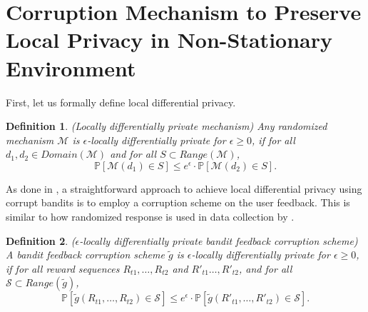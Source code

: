 \documentclass[letterpaper]{article} %
\newcommand{\bP}{\mathds{P}}
\newtheorem{myDefinition}{Definition}
\begin{document}
\section{Corruption Mechanism to Preserve Local Privacy in Non-Stationary Environment}
\label{sec:privacy}
First, let us formally define local differential privacy.
\begin{myDefinition}
\label{def:diff_privacy}
(Locally differentially private mechanism) Any randomized mechanism $\mathcal{M}$ is $\epsilon$-locally differentially private for $\epsilon \geq 0$, if for all  $d_1, d_2 \in Domain(\mathcal{M})$ and for all $S \subset Range(\mathcal{M})$,
$$
\bP[\mathcal{M}(d_1) \in S] \leq e^\epsilon \cdot \bP [\mathcal{M}(d_2) \in S].
$$
\end{myDefinition}
As done in \citet{pmlr-v83-gajane18a}, a straightforward approach to achieve local differential privacy using corrupt bandits is to employ a corruption scheme on the user feedback.
This is similar to how randomized response is used in data collection by \citet{DBLP:conf/edbt/0009WH16}.

\begin{myDefinition}
($\epsilon$-locally differentially private bandit feedback corruption scheme) A bandit feedback corruption scheme $\tilde{g}$ is $\epsilon$-locally differentially private for $\epsilon \geq 0$, if for all reward sequences $R_{t1}, \dots, R_{t2}$ and $R'_{t1} \dots, R'_{t2}$, and for all $\mathcal{S} \subset Range(\tilde{g})$,
\begin{equation*}
\bP [\tilde{g}(R_{t1}, \dots, R_{t2}) \in \mathcal{S} ] \leq e^\epsilon \cdot \bP [\tilde{g}(R'_{t1}, \dots, R'_{t2}) \in \mathcal{S} ].
\end{equation*}
\end{myDefinition}
\end{document}
